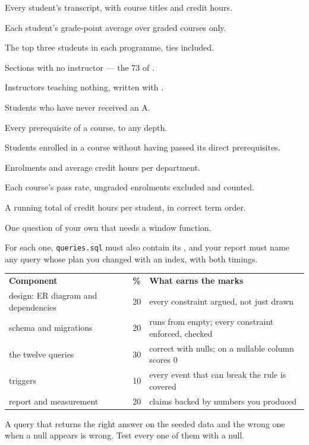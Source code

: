 \begin{examplebox}
\begin{tightnum}
  \item Every student's transcript, with course titles and credit hours.
  \item Each student's grade-point average over graded courses only.
  \item The top three students in each programme, ties included.
  \item Sections with no instructor --- the 73 of .
  \item Instructors teaching nothing, written with .
  \item Students who have never received an A.
  \item Every prerequisite of a course, to any depth.
  \item Students enrolled in a course without having passed its direct
        prerequisites.
  \item Enrolments and average credit hours per department.
  \item Each course's pass rate, ungraded enrolments excluded and counted.
  \item A running total of credit hours per student, in correct term order.
  \item One question of your own that needs a window function.
\end{tightnum}

\smallskip
For each one, \texttt{queries.sql} must also contain its
, and your report must name any query whose plan you
changed with an index, with both timings.
\end{examplebox}

\begin{conceptbox}
\begin{tabular}{@{}L{6.0cm}R{1.6cm}L{6.2cm}@{}}
\textbf{Component} & \textbf{\%} & \textbf{What earns the marks} \\
design: ER diagram and dependencies & 20 & every constraint argued, not just
  drawn \\
schema and migrations & 20 & runs from empty; every constraint enforced,
  checked \\
the twelve queries & 30 & correct with nulls;  on a nullable
  column scores 0 \\
triggers & 10 & every event that can break the rule is covered \\
report and measurement & 20 & claims backed by numbers you produced \\
\end{tabular}

\smallskip
A query that returns the right answer on the seeded data and the wrong one when
a null appears is wrong. Test every one of them with a null.
\end{conceptbox}


